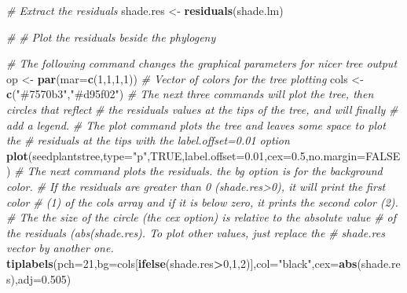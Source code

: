 \documentclass[
]{book}
\newenvironment{Shaded}{\begin{snugshade}}{\end{snugshade}}
\newcommand{\AttributeTok}[1]{\textcolor[rgb]{0.13,0.29,0.53}{#1}}
\newcommand{\CommentTok}[1]{\textcolor[rgb]{0.56,0.35,0.01}{\textit{#1}}}
\newcommand{\ConstantTok}[1]{\textcolor[rgb]{0.56,0.35,0.01}{#1}}
\newcommand{\DecValTok}[1]{\textcolor[rgb]{0.00,0.00,0.81}{#1}}
\newcommand{\FloatTok}[1]{\textcolor[rgb]{0.00,0.00,0.81}{#1}}
\newcommand{\FunctionTok}[1]{\textcolor[rgb]{0.13,0.29,0.53}{\textbf{#1}}}
\newcommand{\NormalTok}[1]{#1}
\newcommand{\OtherTok}[1]{\textcolor[rgb]{0.56,0.35,0.01}{#1}}
\newcommand{\SpecialCharTok}[1]{\textcolor[rgb]{0.81,0.36,0.00}{\textbf{#1}}}
\newcommand{\StringTok}[1]{\textcolor[rgb]{0.31,0.60,0.02}{#1}}
\begin{document}
\begin{Shaded}
\begin{Highlighting}[]
\CommentTok{\# Extract the residuals}
\NormalTok{shade.res }\OtherTok{\textless{}{-}} \FunctionTok{residuals}\NormalTok{(shade.lm)}

\CommentTok{\#}
\CommentTok{\# Plot the residuals beside the phylogeny}

\CommentTok{\# The following command changes the graphical parameters for nicer tree output}
\NormalTok{op }\OtherTok{\textless{}{-}} \FunctionTok{par}\NormalTok{(}\AttributeTok{mar=}\FunctionTok{c}\NormalTok{(}\DecValTok{1}\NormalTok{,}\DecValTok{1}\NormalTok{,}\DecValTok{1}\NormalTok{,}\DecValTok{1}\NormalTok{))}
\CommentTok{\# Vector of colors for the tree plotting}
\NormalTok{cols }\OtherTok{\textless{}{-}} \FunctionTok{c}\NormalTok{(}\StringTok{"\#7570b3"}\NormalTok{,}\StringTok{"\#d95f02"}\NormalTok{)}
\CommentTok{\# The next three commands will plot the tree, then circles that reflect }
\CommentTok{\#  the residuals values at the tips of the tree, and will finally}
\CommentTok{\#  add a legend.}
\CommentTok{\# The plot command plots the tree and leaves some space to plot the }
\CommentTok{\#  residuals at the tips with the \textquotesingle{}label.offset=0.01\textquotesingle{} option}
\FunctionTok{plot}\NormalTok{(seedplantstree,}\AttributeTok{type=}\StringTok{"p"}\NormalTok{,}\ConstantTok{TRUE}\NormalTok{,}\AttributeTok{label.offset=}\FloatTok{0.01}\NormalTok{,}\AttributeTok{cex=}\FloatTok{0.5}\NormalTok{,}\AttributeTok{no.margin=}\ConstantTok{FALSE}\NormalTok{)}
\CommentTok{\# The next command plots the residuals. the \textquotesingle{}bg\textquotesingle{} option is for the background color.}
\CommentTok{\#  If the residuals are greater than 0 (shade.res\textgreater{}0), it will print the first color}
\CommentTok{\#  (1) of the \textquotesingle{}cols\textquotesingle{} array and if it is below zero, it prints the second color (2). }
\CommentTok{\#  The the size of the circle (the \textquotesingle{}cex\textquotesingle{} option) is relative to the absolute value }
\CommentTok{\#  of the residuals (abs(shade.res). To plot other values, just replace the }
\CommentTok{\#  \textquotesingle{}shade.res\textquotesingle{} vector by another one.}
\FunctionTok{tiplabels}\NormalTok{(}\AttributeTok{pch=}\DecValTok{21}\NormalTok{,}\AttributeTok{bg=}\NormalTok{cols[}\FunctionTok{ifelse}\NormalTok{(shade.res}\SpecialCharTok{\textgreater{}}\DecValTok{0}\NormalTok{,}\DecValTok{1}\NormalTok{,}\DecValTok{2}\NormalTok{)],}\AttributeTok{col=}\StringTok{"black"}\NormalTok{,}\AttributeTok{cex=}\FunctionTok{abs}\NormalTok{(shade.res),}\AttributeTok{adj=}\FloatTok{0.505}\NormalTok{)}

\end{Highlighting}
\end{Shaded}
\end{document}
